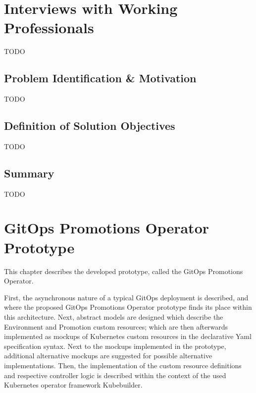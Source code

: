 

\chapter{Interviews with Working Professionals}

TODO

\section{Problem Identification \& Motivation}

TODO

\section{Definition of Solution Objectives}\label{interviews:definitionSolutionObjectives}

TODO

\section{Summary}

TODO











\chapter{GitOps Promotions Operator Prototype}

This chapter describes the developed prototype,
called the GitOps Promotions Operator.

First, the asynchronous nature of a typical GitOps deployment is described,
and where the proposed GitOps Promotions Operator prototype finds its place within
this architecture.
Next, abstract models are designed which describe the Environment and Promotion 
custom resources; which are then afterwards implemented as mockups of 
Kubernetes custom resources in the declarative Yaml specification syntax.
Next to the mockups implemented in the prototype,
additional alternative mockups are suggested for possible alternative implementations.
Then, the implementation of the custom resource definitions and respective controller logic
is described within the context of the used Kubernetes operator framework Kubebuilder.

